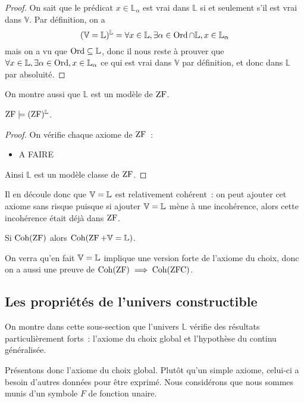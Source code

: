 \begin{proof}
  On sait que le prédicat $x\in \mathbb L_{\alpha}$ est vrai dans
  $\mathbb L$ si et seulement s'il est vrai dans $\mathbb V$. Par définition,
  on a
  \[(\mathbb V = \mathbb L)^{\mathbb L} =
  \forall x \in \mathbb L,\exists \alpha \in \operatorname{Ord}\cap \mathbb L,
  x\in \mathbb L_\alpha\]
  mais on a vu que $\operatorname{Ord}\subseteq \mathbb L$, donc il nous reste à prouver que
  $\forall x \in \mathbb L, \exists \alpha \in \operatorname{Ord}, x \in \mathbb L_\alpha$
  ce qui est vrai dans $\mathbb V$ par définition, et donc dans
  $\mathbb L$ par absoluité.
\end{proof}

On montre aussi que $\mathbb L$ est un modèle de $\operatorname{ZF}$.

\begin{theorem}
  $\operatorname{ZF}\models (\operatorname{ZF})^{\mathbb L}$.
\end{theorem}

\begin{proof}
  On vérifie chaque axiome de $\operatorname{ZF}$~:
  \begin{itemize}
  \item A FAIRE
  \end{itemize}
  Ainsi $\mathbb L$ est un modèle classe de $\operatorname{ZF}$.
\end{proof}

Il en découle donc que $\mathbb V = \mathbb L$ est relativement cohérent~: on peut ajouter cet
axiome sans risque puisque si ajouter $\mathbb V = \mathbb L$ mène à une incohérence, alors
cette incohérence était déjà dans $\operatorname{ZF}$.

\begin{corollary}
  Si $\operatorname{Coh}(\operatorname{ZF})$ alors $\operatorname{Coh}(\operatorname{ZF} + \mathbb V = \mathbb L)$.
\end{corollary}

\begin{remark}
  On verra qu'en fait $\mathbb V = \mathbb L$ implique une version forte de l'axiome du choix,
  donc on a aussi une preuve de $\operatorname{Coh}(\operatorname{ZF})\implies \operatorname{Coh}(\operatorname{ZFC})$.
\end{remark}

\subsection{Les propriétés de l'univers constructible}

On montre dans cette sous-section que l'univers $\mathbb L$ vérifie des
résultats particulièrement forts~: l'axiome du choix global et l'hypothèse du
continu généralisée.

Présentons donc l'axiome du choix global. Plutôt qu'un simple axiome, celui-ci
a besoin d'autres données pour être exprimé. Nous considérons que nous sommes
munis d'un symbole $F$ de fonction unaire.

